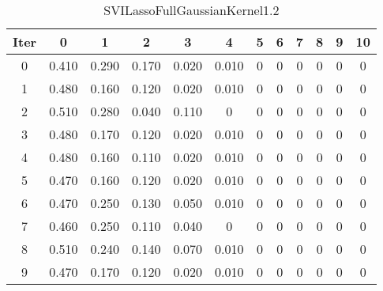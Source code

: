 \begin{table}
	\begin{center}
		\begin{tabular}{|c|c|c|c|c|c|c|c|c|c|c|c|}
			\hline
			Iter & 0 & 1 & 2 & 3 & 4 & 5 & 6 & 7 & 8 & 9 & 10 \\
			\hline
			0 & 0.410 & 0.290 & 0.170 & 0.020 & 0.010 & 0 & 0 & 0 & 0 & 0 & 0 \\
			\hline
			1 & 0.480 & 0.160 & 0.120 & 0.020 & 0.010 & 0 & 0 & 0 & 0 & 0 & 0 \\
			\hline
			2 & 0.510 & 0.280 & 0.040 & 0.110 & 0 & 0 & 0 & 0 & 0 & 0 & 0 \\
			\hline
			3 & 0.480 & 0.170 & 0.120 & 0.020 & 0.010 & 0 & 0 & 0 & 0 & 0 & 0 \\
			\hline
			4 & 0.480 & 0.160 & 0.110 & 0.020 & 0.010 & 0 & 0 & 0 & 0 & 0 & 0 \\
			\hline
			5 & 0.470 & 0.160 & 0.120 & 0.020 & 0.010 & 0 & 0 & 0 & 0 & 0 & 0 \\
			\hline
			6 & 0.470 & 0.250 & 0.130 & 0.050 & 0.010 & 0 & 0 & 0 & 0 & 0 & 0 \\
			\hline
			7 & 0.460 & 0.250 & 0.110 & 0.040 & 0 & 0 & 0 & 0 & 0 & 0 & 0 \\
			\hline
			8 & 0.510 & 0.240 & 0.140 & 0.070 & 0.010 & 0 & 0 & 0 & 0 & 0 & 0 \\
			\hline
			9 & 0.470 & 0.170 & 0.120 & 0.020 & 0.010 & 0 & 0 & 0 & 0 & 0 & 0 \\
			\hline
		\end{tabular}
	\end{center}
	\caption{SVILassoFullGaussianKernel1.2}
\end{table}